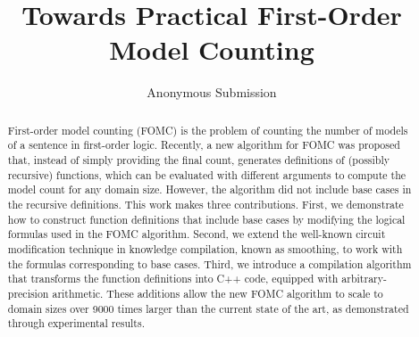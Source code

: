 \documentclass[letterpaper]{article} %
\title{Towards Practical First-Order Model Counting}
\author{Anonymous Submission}
\theoremstyle{remark}
\theoremstyle{definition}
\begin{document}
\maketitle

\begin{abstract}
  First-order model counting (FOMC) is the problem of counting the number of
  models of a sentence in first-order logic. Recently, a new algorithm for FOMC
  was proposed that, instead of simply providing the final count, generates
  definitions of (possibly recursive) functions, which can be evaluated with
  different arguments to compute the model count for any domain size. However,
  the algorithm did not include base cases in the recursive definitions. This
  work makes three contributions. First, we demonstrate how to construct
  function definitions that include base cases by modifying the logical formulas
  used in the FOMC algorithm. Second, we extend the well-known circuit
  modification technique in knowledge compilation, known as smoothing, to work
  with the formulas corresponding to base cases. Third, we introduce a
  compilation algorithm that transforms the function definitions into C++ code,
  equipped with arbitrary-precision arithmetic. These additions allow the new
  FOMC algorithm to scale to domain sizes over \num{9000} times larger than the
  current state of the art, as demonstrated through experimental results.
\end{abstract}




\end{document}
